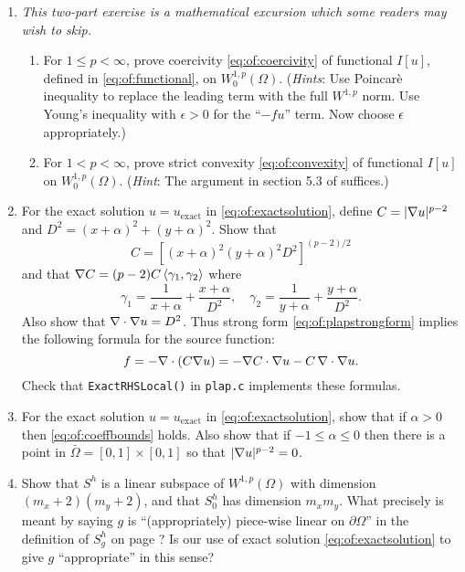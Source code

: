 \renewcommand{\labelenumi}{\arabic{chapter}.\arabic{enumi}\quad}
\renewcommand{\labelenumii}{(\alph{enumii})}
\begin{enumerate}
\item  \label{exer:of:twoproperties}  \emph{This two-part exercise is a mathematical excursion which some readers may wish to skip.}
  \begin{enumerate}
  \item For $1 \le p < \infty$, prove coercivity \eqref{eq:of:coercivity} of functional $I[u]$, defined in \eqref{eq:of:functional}, on $W_0^{1,p}(\Omega)$.  (\emph{Hints}:  Use Poincar\`e inequality \citep[Theorem 6.30]{AdamsFournier2003} to replace the leading term with the full $W^{1,p}$ norm.  Use Young's inequality with $\epsilon>0$ \citep[Appendix B]{Evans2010} for the ``$-fu$'' term.  Now choose $\epsilon$ appropriately.)
  \item For $1 < p < \infty$, prove strict convexity \eqref{eq:of:convexity} of functional $I[u]$ on $W_0^{1,p}(\Omega)$.  (\emph{Hint}:  The argument in section 5.3 of \citet{Ciarlet2002} suffices.)
  \end{enumerate}
 
\item \label{exer:of:checkexactformulas}  For the exact solution $u=u_{\text{exact}}$ in \eqref{eq:of:exactsolution}, define $C = |\nabla u|^{p-2}$ and $D^2=(x+\alpha)^2 + (y+\alpha)^2$.  Show that
    $$C = \left[(x+\alpha)^2 (y+\alpha)^2 D^2\right]^{(p-2)/2}$$
and that $\nabla C = (p-2) C \left<\gamma_1,\gamma_2\right>$ where
    $$\gamma_1 = \frac{1}{x+\alpha}+ \frac{x+\alpha}{D^2}, \quad \gamma_2 = \frac{1}{y+\alpha}+ \frac{y+\alpha}{D^2}.$$
Also show that $\nabla\cdot \nabla u = D^2$.  Thus strong form \eqref{eq:of:plapstrongform} implies the following formula for the source function:
    $$f = - \nabla\cdot \left(C \nabla u\right) = - \nabla C \cdot \nabla u - C\, \nabla\cdot \nabla u.$$
Check that \texttt{ExactRHSLocal()} in \texttt{plap.c} implements these formulas.

\item \label{exer:of:checkexactbounds}  For the exact solution $u=u_{\text{exact}}$ in \eqref{eq:of:exactsolution}, show that if $\alpha>0$ then \eqref{eq:of:coeffbounds} holds.  Also show that if $-1 \le \alpha \le 0$ then there is a point in $\bar\Omega=[0,1]\times[0,1]$ so that $|\nabla u|^{p-2}=0$.

\item Show that $S^h$ is a linear subspace of $W^{1,p}(\Omega)$ with dimension $(m_x+2)(m_y+2)$, and that $S_0^h$ has dimension $m_x m_y$.  What precisely is meant by saying $g$ is ``(appropriately) piece-wise linear on $\partial\Omega$'' in the definition of $S_g^h$ on page \pageref{eq:of:Sghdefn}?  Is our use of exact solution \eqref{eq:of:exactsolution} to give $g$ ``appropriate'' in this sense?


\end{enumerate}
